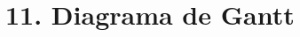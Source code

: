 \documentclass[
11pt, %
]{charter}
\begin{document}
%



\section{11. Diagrama de Gantt}
\label{sec:gantt}

%
%
%
%
%
\end{document}
